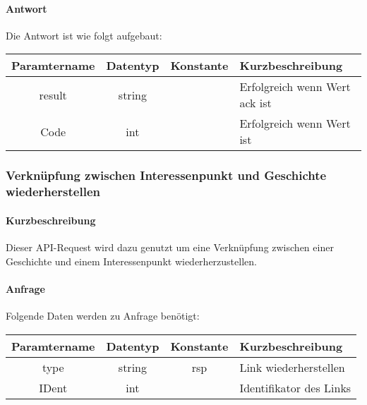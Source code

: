\paragraph{Antwort}Die Antwort ist wie folgt aufgebaut:
\begin{table}[H]
	\begin{tabular}{|c|c|c|p{6.5cm}|}
		\hline
		\textbf{Paramtername} & \textbf{Datentyp} & \textbf{Konstante} & \textbf{Kurzbeschreibung}                                                                                               \\ \hline
		result              & string           &                 & Erfolgreich wenn Wert {\glqq ack\grqq} ist \\ \hline
		Code                & int              &                 & Erfolgreich wenn Wert {\glqq 0\grqq} ist \\ \hline
	\end{tabular}
\end{table}
\subsubsection{Verknüpfung zwischen Interessenpunkt und Geschichte wiederherstellen}
\paragraph{Kurzbeschreibung}Dieser API-Request wird dazu genutzt um eine Verknüpfung zwischen einer Geschichte und einem Interessenpunkt wiederherzustellen.
\paragraph{Anfrage}Folgende Daten werden zu Anfrage benötigt:
\begin{table}[H]
	\begin{tabular}{|c|c|c|p{6.5cm}|}
		\hline
		\textbf{Paramtername} & \textbf{Datentyp} & \textbf{Konstante} & \textbf{Kurzbeschreibung}                                                                                               \\ \hline
		type                & string            & rsp                & Link wiederherstellen \\ \hline
		IDent               & int               &                    & Identifikator des Links \\ \hline
	\end{tabular}
\end{table}
